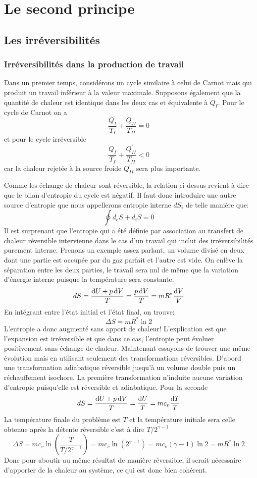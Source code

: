 \section{Le second principe}
\subsection{Les irréversibilités}
\subsubsection{Irréversibilités dans la production de travail}
Dans un premier temps, considérons un cycle similaire à
celui de Carnot mais qui produit un travail inférieur à la valeur maximale.
Supposons également que la quantité de chaleur est
identique dans les deux cas et équivalente à $Q_I$.
Pour le cycle de Carnot on a
\[ \frac {Q_I}{T_I} + \frac{Q_{II}}{T_{II}} = 0 \]
et pour le cycle irréversible
\[  \frac {Q_I}{T_I} + \frac {Q^{'}_{II}}{T_{II}} < 0 \]
car la chaleur rejetée à la source froide $Q^{'}_{II}$ sera plus importante.

Comme les échange de chaleur sont réversible, la relation
ci-dessus revient à dire que le bilan d'entropie du cycle est négatif.
Il faut donc introduire une autre source d'entropie que
nous appellerons entropie interne $dS_i$ de telle manière que:
\[ \oint d_eS +d_iS = 0 \]
Il est surprenant que l'entropie qui a été définie par association
au transfert de chaleur réversible intervienne dans le cas
d'un travail qui inclut des irréversibilités purement interne.
Prenons un exemple assez parlant,
un volume divisé en deux dont une partie est
occupée par du gaz parfait et l'autre est vide.
On enlève la séparation entre les deux parties,
le travail sera nul de même que la variation d'énergie interne
puisque la température sera constante.
\[ dS = \frac{\operatorname{d}\! U+p\operatorname{d}\! V}{T} = \frac{p\operatorname{d}\! V}T = mR^*\frac{\operatorname{d}\! V}V \]
En intégrant entre l'état initial et l'état final, on trouve:
\[ \Delta S = mR^* \ln 2 \]
L'entropie a donc augmenté sans apport de chaleur!
L'explication est que l'expansion est irréversible et que dans ce cas,
l'entropie peut évoluer positivement sans échange de chaleur.
Maintenant essayons de trouver une même évolution mais
en utilisant seulement des transformations réversibles.
D'abord une transformation adiabatique réversible jusqu'à
un volume double puis un réchauffement isochore.
La première transformation n'induite aucune
variation d'entropie puisqu'elle est réversible et adiabatique.
Pour la seconde
\[ dS = \frac{\operatorname{d}\! U+ p\operatorname{d}\! V}{T} = \frac{\operatorname{d}\! U}{T} = mc_v\frac {\operatorname{d}\! T}{T} \]
La température finale du problème est $T$ et la température initiale
sera celle obtenue après la détente réversible c'est à dire $T/2^{\gamma -1}$
\[ \Delta S = mc_v \ln \left(\frac T{T/2^{\gamma-1}}\right) =
mc_v \ln (2^{\gamma-1}) = mc_v(\gamma -1) \ln 2 = mR^*  \ln 2 \]
Donc pour aboutir au même résultat de manière réversible,
il serait nécessaire d'apporter de la chaleur au système,
ce qui est donc bien cohérent.


